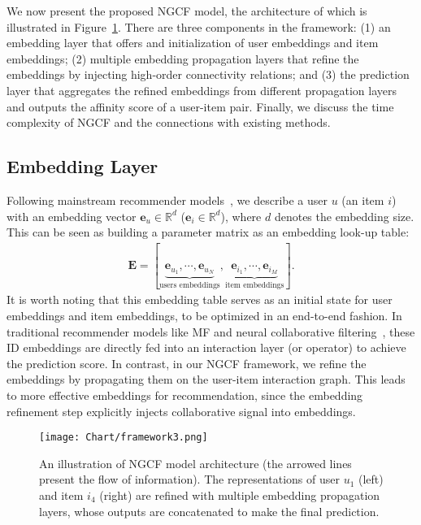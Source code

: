 \documentclass[sigconf]{acmart}
\newcommand{\Mat}[1]{\mathbf{#1}}
\newcommand{\Space}[1]{\mathbb{#1}}
\theoremstyle{definition}
\begin{document}
We now present the proposed NGCF model, the architecture of which is illustrated in Figure~\ref{fig:embedding-propagation}.
There are three components in the framework:
(1) an embedding layer that offers and initialization of user embeddings and item embeddings; 
(2) multiple embedding propagation layers that refine the embeddings by
injecting high-order connectivity relations;
and (3) the prediction layer that aggregates the refined embeddings from different propagation layers and outputs the affinity score of a user-item pair.
Finally, we discuss the time complexity of NGCF and the connections with existing methods.

\subsection{Embedding Layer}
Following mainstream recommender models~\cite{BPRMF,NCF,KTUP}, we describe a user $u$ (an item $i$) with an embedding vector $\Mat{e}_{u}\in\Space{R}^{d}$ ($\Mat{e}_{i}\in\Space{R}^{d}$), where  $d$ denotes the embedding size.
This can be seen as building a parameter matrix as an embedding look-up table: 
\begin{gather}\label{equ:e-0}
	\Mat{E}=[\underbrace{\Mat{e}_{u_{1}},\cdots,\Mat{e}_{u_{N}}}_{\text{users embeddings}}, \underbrace{\Mat{e}_{i_{1}},\cdots,\Mat{e}_{i_{M}}}_{\text{item embeddings}}].
\end{gather}
It is worth noting that this embedding table serves as an initial state for user embeddings and item embeddings, to be optimized in an end-to-end fashion. 
In traditional recommender models like MF and neural collaborative filtering~\cite{NCF}, these ID embeddings are directly fed into an interaction layer (or operator) to achieve the prediction score. 
In contrast, in our NGCF framework, we refine the embeddings by propagating them on the user-item interaction graph. This leads to more effective embeddings for recommendation, since the embedding refinement step explicitly injects collaborative signal into embeddings. 

\begin{figure}[t]
\centering
\texttt{[image: Chart/framework3.png]}
\vspace{-10pt}
\caption{An illustration of NGCF model architecture  (the arrowed lines present the flow of information). The representations of user $u_{1}$ (left) and item $i_{4}$ (right) are refined with multiple embedding propagation layers, whose outputs are  concatenated to make the final prediction.
}
\label{fig:embedding-propagation}
\vspace{-15pt}
\end{figure}
\end{document}
